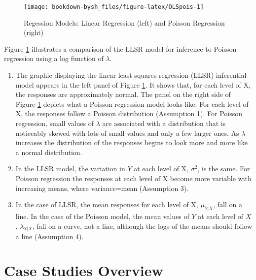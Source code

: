 \documentclass[
]{krantz}
\providecommand{\tightlist}{%
  \setlength{\itemsep}{0pt}\setlength{\parskip}{0pt}}
\begin{document}
\begin{figure}

{\centering \texttt{[image: bookdown-bysh\_files/figure-latex/OLSpois-1]} 

}

\caption{Regession Models: Linear Regression (left) and Poisson Regression (right)}\label{fig:OLSpois}
\end{figure}

Figure \ref{fig:OLSpois} illustrates a comparison of the LLSR model for inference to Poisson regression using a log function of \(\lambda\).

\begin{enumerate}
\def\labelenumi{\arabic{enumi}.}
\tightlist
\item
  The graphic displaying the linear least squares regression (LLSR) inferential model appears in the left panel of Figure \ref{fig:OLSpois}. It shows that, for each level of X, the responses are approximately normal. The panel on the right side of Figure \ref{fig:OLSpois} depicts what a Poisson regression model looks like. For each level of X, the responses follow a Poisson distribution (Assumption 1). For Poisson regression, small values of \(\lambda\) are associated with a distribution that is noticeably skewed with lots of small values and only a few larger ones. As \(\lambda\) increases the distribution of the responses begins to look more and more like a normal distribution.
\item
  In the LLSR model, the variation in \(Y\) at each level of X, \(\sigma^2\), is the same. For Poisson regression the responses at each level of X become more variable with increasing means, where variance=mean (Assumption 3).
\item
  In the case of LLSR, the mean responses for each level of X, \(\mu_{Y|X}\), fall on a line. In the case of the Poisson model, the mean values of \(Y\) at each level of \(X\), \(\lambda_{Y|X}\), fall on a curve, not a line, although the logs of the means should follow a line (Assumption 4).
\end{enumerate}

\hypertarget{case-studies-overview}{%
\section{Case Studies Overview}\label{case-studies-overview}}
\end{document}
